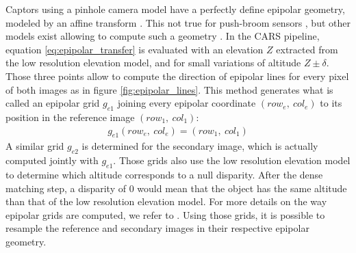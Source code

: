 Captors using a pinhole camera model have a perfectly define epipolar geometry, modeled by an affine transform \cite{hartley_multiple_2004}. This not true for push-broom sensors \cite{morgan_epipolar_2004}, but other models exist allowing to compute such a geometry \cite{oh_piecewise_2010, de_franchis_stereo-rectification_2014, koh_unified_2016, michel_new_2020}. In the CARS pipeline, equation \eqref{eq:epipolar_transfer} is evaluated with an elevation $Z$ extracted from the low resolution elevation model, and for small variations of altitude $Z\pm\delta$. Those three points allow to compute the direction of epipolar lines for every pixel of both images as in figure \ref{fig:epipolar_lines}. This method generates what is called an epipolar grid $g_{e1}$ joining every epipolar coordinate $(row_e, ~col_e)$ to its position in the reference image $(row_1, ~col_1)$:
\begin{align}\label{eq:epipolar_grid}
    g_{e1}(row_e, ~col_e) = (row_1, ~col_1)
\end{align}
A similar grid $g_{e2}$ is determined for the secondary image, which is actually computed jointly with $g_{e1}$. Those grids also use the low resolution elevation model to determine which altitude corresponds to a null disparity. After the dense matching step, a disparity of $0$ would mean that the object has the same altitude than that of the low resolution elevation model. For more details on the way epipolar grids are computed, we refer to \cite{michel_new_2020}. Using those grids, it is possible to resample the reference and secondary images in their respective epipolar geometry. 

